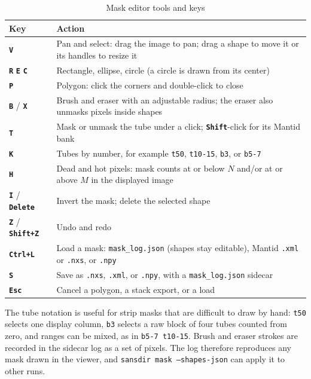 \documentclass[tm]{ornltm}
\newcommand{\key}[1]{\textbf{\texttt{#1}}}
\begin{document}
\begin{table}[ht]
  \centering
  \caption{Mask editor tools and keys}
  \label{tab:maskkeys}
  \small
  \begin{tabular}{l p{}}
    \toprule
    Key & Action \\
    \midrule
    \key{V} & Pan and select: drag the image to pan; drag a shape to move it or
      its handles to resize it \\
    \key{R} \key{E} \key{C} & Rectangle, ellipse, circle (a circle is drawn
      from its center) \\
    \key{P} & Polygon: click the corners and double-click to close \\
    \key{B} / \key{X} & Brush and eraser with an adjustable radius; the eraser
      also unmasks pixels inside shapes \\
    \key{T} & Mask or unmask the tube under a click; \key{Shift}-click for its
      Mantid bank \\
    \key{K} & Tubes by number, for example \texttt{t50}, \texttt{t10-15},
      \texttt{b3}, or \texttt{b5-7} \\
    \key{H} & Dead and hot pixels: mask counts at or below $N$ and/or at or
      above $M$ in the displayed image \\
    \key{I} / \key{Delete} & Invert the mask; delete the selected shape \\
    \key{Z} / \key{Shift+Z} & Undo and redo \\
    \key{Ctrl+L} & Load a mask: \texttt{mask\_log.json} (shapes stay
      editable), Mantid \texttt{.xml} or \texttt{.nxs}, or \texttt{.npy} \\
    \key{S} & Save as \texttt{.nxs}, \texttt{.xml}, or \texttt{.npy}, with a
      \texttt{mask\_log.json} sidecar \\
    \key{Esc} & Cancel a polygon, a stack export, or a load \\
    \bottomrule
  \end{tabular}
\end{table}

The tube notation is useful for strip masks that are difficult to draw by hand:
\texttt{t50} selects one display column, \texttt{b3} selects a raw block of four
tubes counted from zero, and ranges can be mixed, as in \texttt{b5-7 t10-15}.
Brush and eraser strokes are recorded in the sidecar log as a set of pixels.
The log therefore reproduces any mask drawn in the viewer, and
\texttt{sansdir mask --shapes-json} can apply it to other runs.
\end{document}
